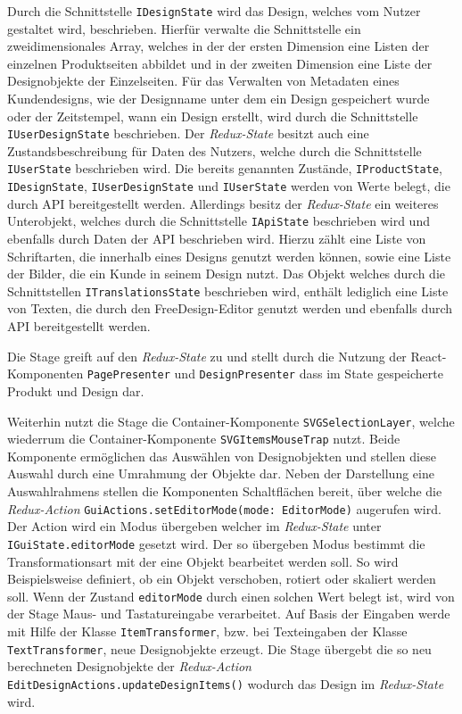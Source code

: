 Durch die Schnittstelle \lstinline|IDesignState| wird das Design, welches vom Nutzer gestaltet wird, beschrieben. Hierfür verwalte die Schnittstelle ein zweidimensionales Array, welches in der der ersten Dimension eine Listen  der einzelnen Produktseiten abbildet und in der zweiten Dimension eine Liste der Designobjekte der Einzelseiten. Für das Verwalten von Metadaten eines Kundendesigns, wie der Designname unter dem ein Design gespeichert wurde oder der Zeitstempel, wann ein Design erstellt, wird durch die Schnittstelle \lstinline|IUserDesignState| beschrieben. 
Der \emph{Redux-State} besitzt auch eine Zustandsbeschreibung für Daten des Nutzers, welche durch die Schnittstelle \lstinline|IUserState| beschrieben wird. Die bereits genannten Zustände, \lstinline|IProductState|, \lstinline|IDesignState|, \lstinline|IUserDesignState| und \lstinline|IUserState| werden von Werte belegt, die durch API bereitgestellt werden. Allerdings besitz der \emph{Redux-State} ein weiteres Unterobjekt, welches durch die Schnittstelle  \lstinline|IApiState| beschrieben wird und ebenfalls durch Daten der API beschrieben wird. Hierzu zählt eine Liste von Schriftarten, die innerhalb eines Designs genutzt werden können, sowie eine Liste der Bilder, die ein Kunde in seinem Design nutzt.  
Das Objekt welches durch die Schnittstellen \lstinline|ITranslationsState| beschrieben wird, enthält lediglich eine Liste von Texten, die durch den FreeDesign-Editor genutzt werden und ebenfalls durch API bereitgestellt werden. 

Die Stage greift auf den \emph{Redux-State} zu und stellt durch die Nutzung der React-Komponenten \lstinline|PagePresenter| und \lstinline|DesignPresenter| dass im State gespeicherte Produkt und Design dar.

Weiterhin nutzt die Stage die Container-Komponente \lstinline|SVGSelectionLayer|, welche wiederrum die Container-Komponente \lstinline|SVGItemsMouseTrap| nutzt. Beide Komponente ermöglichen das Auswählen von Designobjekten und stellen diese Auswahl durch eine Umrahmung der Objekte dar. Neben der Darstellung eine Auswahlrahmens stellen die Komponenten Schaltflächen bereit, über welche die \emph{Redux-Action} \lstinline|GuiActions.setEditorMode(mode: EditorMode)| augerufen wird. Der Action wird ein Modus übergeben welcher im \emph{Redux-State} unter \lstinline|IGuiState.editorMode| gesetzt wird. Der so übergeben Modus bestimmt die Transformationsart mit der eine Objekt bearbeitet werden soll. So wird Beispielsweise definiert, ob ein Objekt verschoben, rotiert oder skaliert werden soll. Wenn der Zustand \lstinline|editorMode|  durch einen solchen Wert belegt ist, wird von der Stage Maus- und Tastatureingabe verarbeitet. Auf Basis der Eingaben werde mit Hilfe der Klasse \lstinline|ItemTransformer|, bzw. bei Texteingaben der Klasse \lstinline|TextTransformer|, neue Designobjekte erzeugt.  
Die Stage übergebt die so neu berechneten Designobjekte der \emph{Redux-Action} \lstinline|EditDesignActions.updateDesignItems()| wodurch das Design im \emph{Redux-State} wird.

